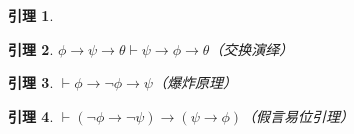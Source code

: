 \documentclass[punct=custom/kaiming,fontset=none]{ctexart}
\makeatletter
\renewenvironment{proof}[1][\proofname]{\par
  \pushQED{\qed}%
  \normalfont \topsep6\p@\@plus6\p@\relax
  \trivlist
  \item[\hskip\labelsep
    \bfseries
    #1%
    ]\ignorespaces
}{%
  \popQED\endtrivlist\@endpefalse
}
\newtheorem*{lemma*}{引理}
\let\proves\vdash
\makeatother
\begin{document}
\begin{description}
\begin{lemma*}
\begin{proof}
\begin{ND}
        \label{3}
        \label{4}
      \end{ND}
    \end{proof}
  \end{lemma*}
  \begin{lemma*}
    \label{ded:comm}
    \(\phi \to \psi \to \theta \proves \psi \to \phi \to \theta\)\hfill（交换演绎）
    \begin{proof}
      \leavevmode
      \begin{ND}
        \label{1}
        \label{2}
        \label{3}
        \label{4}
      \end{ND}
    \end{proof}
  \end{lemma*}
  \begin{lemma*}
    \label{lem:exFalso}
    \(\proves \phi \to \neg\phi \to \psi\)\hfill（爆炸原理）
    \begin{proof}
      \leavevmode
      \begin{ND}
        \label{1}
        \label{2}
        \label{3}
        \label{4}
        \label{5}
        \label{6}
      \end{ND}
    \end{proof}
  \end{lemma*}
  \begin{lemma*}
    \label{lem:contrapose}
    \(\proves (\neg\phi \to \neg\psi) \to (\psi \to \phi)\)\hfill（假言易位引理）
    \begin{proof}
      \leavevmode

\end{proof}
\end{lemma*}
\end{description}
\end{document}
